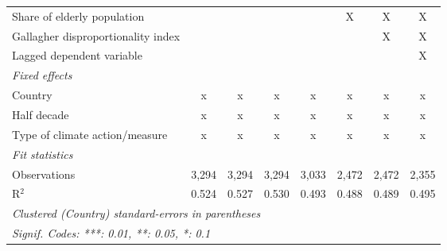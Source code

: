 \begin{tabular}{lccccccc}
   Share of elderly population                                                   &              &              &               &              & X              & X              & X\\  
   Gallagher disproportionality index                                            &              &              &               &              &                & X              & X\\  
   Lagged dependent variable                                                     &              &              &               &              &                &                & X\\  
   \emph{Fixed effects}\\
   Country                                                                       & x            & x            & x             & x            & x              & x              & x\\  
   Half decade                                                                   & x            & x            & x             & x            & x              & x              & x\\  
   Type of climate action/measure                                                & x            & x            & x             & x            & x              & x              & x\\  
   \midrule \emph{Fit statistics}\\
   Observations                                                                  & 3,294        & 3,294        & 3,294         & 3,033        & 2,472          & 2,472          & 2,355\\  
   R$^2$                                                                         & 0.524        & 0.527        & 0.530         & 0.493        & 0.488          & 0.489          & 0.495\\  
   \midrule
   \multicolumn{8}{l}{\emph{Clustered (Country) standard-errors in parentheses}}\\
   \multicolumn{8}{l}{\emph{Signif. Codes: ***: 0.01, **: 0.05, *: 0.1}}\\
\end{tabular}
\par\endgroup


